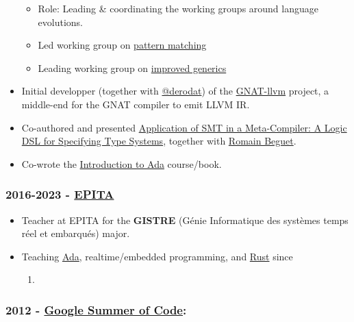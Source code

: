 \documentclass[10pt,letterpaper]{article}
\providecommand{\tightlist}{%
  \setlength{\itemsep}{0pt}\setlength{\parskip}{0pt}}
\begin{document}
\begin{itemize}
  \begin{itemize}
  \tightlist
  \item
    Role: Leading \& coordinating the working groups around language
    evolutions.
  \item
    Led working group on
    \href{https://github.com/AdaCore/ada-spark-rfcs/pull/50}{pattern
    matching}
  \item
    Leading working group on
    \href{https://github.com/AdaCore/ada-spark-rfcs/pull/103}{improved
    generics}
  \end{itemize}
\item
  Initial developper (together with
  \href{https://github.com/pmderodat}{@derodat}) of the
  \href{https://github.com/AdaCore/gnat-llvm}{GNAT-llvm} project, a
  middle-end for the GNAT compiler to emit LLVM IR.
\item
  Co-authored and presented
  \href{https://dblp.org/pid/170/1454.html}{Application of SMT in a
  Meta-Compiler: A Logic DSL for Specifying Type Systems}, together with
  \href{https://www.linkedin.com/in/romain-beguet-88719a130/}{Romain
  Beguet}.
\item
  Co-wrote the
  \href{https://learn.adacore.com/pdf_books/courses/intro-to-ada.pdf}{Introduction
  to Ada} course/book.
\end{itemize}

\hypertarget{epita}{%
\subsubsection{\texorpdfstring{\textbf{2016-2023} -
\href{https://www.epita.fr/en/}{EPITA}}{2016-2023 - EPITA}}\label{epita}}

\begin{itemize}
\tightlist
\item
  Teacher at EPITA for the \textbf{GISTRE} (Génie Informatique des
  systèmes temps réel et embarqués) major.
\item
  Teaching
  \href{https://en.wikipedia.org/wiki/Ada_(programming_language)}{Ada},
  realtime/embedded programming, and
  \href{https://www.rust-lang.org/}{Rust} since

  \begin{enumerate}
  \def\labelenumi{\arabic{enumi}.}
  \setcounter{enumi}{2019}
  \tightlist
  \item
  \end{enumerate}
\end{itemize}

\hypertarget{google-summer-of-code}{%
\subsubsection{\texorpdfstring{\textbf{2012} -
\href{https://summerofcode.withgoogle.com/}{Google Summer of
Code}:}{2012 - Google Summer of Code:}}\label{google-summer-of-code}}
\end{document}
